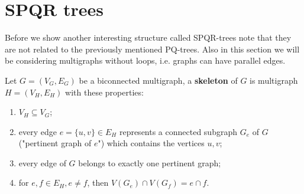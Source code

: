 \chapter{SPQR trees}

Before we show another interesting structure called SPQR-trees note that they are not related to the previously mentioned PQ-trees. Also in this section we will be considering multigraphs without loops, i.e. graphs can have parallel edges.

\begin{defn}
	Let $G = (V_G, E_G)$ be a biconnected multigraph, a \textbf{skeleton} of $G$ is multigraph $H = (V_H, E_H)$ with these properties:
	
	\begin{enumerate}
		\item $V_H \subseteq V_G$;
		\item every edge $e = \{u,v\} \in E_H$ represents a connected subgraph $G_e$ of $G$ ("pertinent graph of $e$") which contains the vertices $u,v$;
		\item every edge of $G$ belongs to exactly one pertinent graph;
		\item for $e,f \in E_H, e \neq f$, then $V(G_e) \cap V(G_f) = e \cap f$.
	\end{enumerate}
\end{defn}


